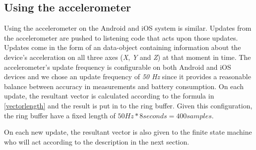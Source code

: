 \documentclass[12pt, a4paper, onecolumn]{article}
\begin{document}
		\subsection{Using the accelerometer}
			Using the accelerometer on the Android and iOS system is similar. Updates from the accelerometer are pushed to listening code that acts upon those updates. Updates come in the form of an data-object containing information about the device's acceleration on all three axes (\textit{X}, \textit{Y} and \textit{Z}) at that moment in time. The accelerometer's update frequency is configurable on both Android and iOS devices and we chose an update frequency of \textit{50 Hz} since it provides a reasonable balance between accuracy in measurements and battery consumption. On each update, the resultant vector is calculated according to the formula in \ref{vectorlength} and the result is put in to the ring buffer. Given this configuration, the ring buffer have a fixed length of \(50 Hz * 8 seconds = 400 samples\). 
			
			On each new update, the resultant vector is also given to the finite state machine who will act according to the description in the next section.
	




\end{document}
